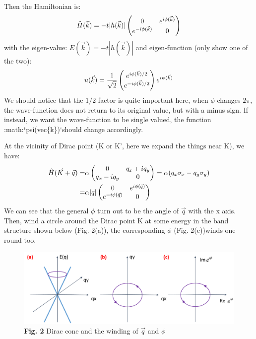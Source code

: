 \documentclass[letterpaper,10pt,english]{sphinxmanual}
\begin{document}
Then the Hamiltonian is:
\begin{gather}
\begin{split}\hat{H}(\vec{k})=-t|h(\vec{k})|\begin{pmatrix}0 &e^{i\phi(\vec{k})}\\e^{-i\phi(\vec{k})} &0\end{pmatrix}\end{split}\notag
\end{gather}
with the eigen-value: \(E(\vec{k})=-t|h(\vec{k})|\) and eigen-function (only show one of the two):
\begin{gather}
\begin{split}u(\vec{k})=\frac{1}{\sqrt{2}}\begin{pmatrix}e^{i\phi(\vec{k})/2}\\e^{-i\phi(\vec{k})/2} \end{pmatrix}e^{i\psi(\vec{k})}\end{split}\notag
\end{gather}
We should notice that the \(1/2\) factor is quite important here, when \(\phi\) changes \(2\pi\), the wave-function does not return to its original value, but with a minus sign. If instead, we want the wave-function to be single valued, the function :math:{\color{red}\bfseries{}{}`}psi(vec\{k\}){}`should change accordingly.

At the vicinity of Dirac point (K or K', here we expand the things near K), we have:
\begin{gather}
\begin{split}\hat{H}(\vec{K}+\vec{q})=&\alpha\begin{pmatrix}0&q_x+iq_y\\q_x-iq_y&0\end{pmatrix}=\alpha(q_x\sigma_x-q_y\sigma_y) \\
=&\alpha|q|\begin{pmatrix}0 &e^{i\phi(\vec{q})}\\e^{-i\phi(\vec{q})} &0\end{pmatrix}\end{split}\notag
\end{gather}
We can see that the general \(\phi\) turn out to be the angle of \(\vec{q}\) with the x axis. Then, wind a circle around the Dirac point K at some energy in the band structure shown below (Fig. 2(a)), the corresponding \(\phi\) (Fig. 2(c))winds one round too.
\begin{figure}[htbp]
\centering
\capstart

\includegraphics[width=0.750\linewidth]{2.png}
\caption{\textbf{Fig. 2} Dirac cone and the winding of \(\vec{q}\) and \(\phi\)}\end{figure}
\end{document}
